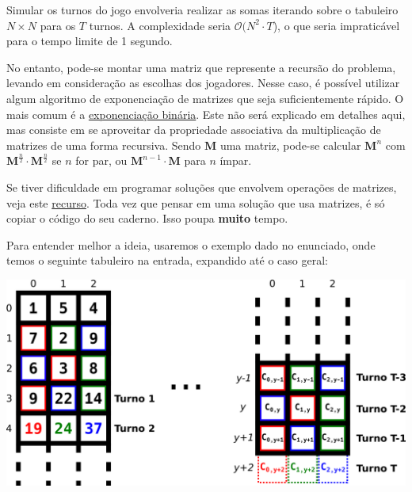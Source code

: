 \newcommand{\red}[1]{\textcolor{meuVermelho}{#1}}
\newcommand{\green}[1]{\textcolor{meuVerde}{#1}}
\newcommand{\blue}[1]{\textcolor{meuAzul}{#1}}

Simular os turnos do jogo envolveria realizar as somas iterando sobre o tabuleiro $N \times N$ para os $T$ turnos. A complexidade seria $\mathcal{O}(N^2\cdot T$), o que seria impraticável para o tempo limite de 1 segundo.

No entanto, pode-se montar uma matriz que represente a recursão do problema, levando em consideração as escolhas dos jogadores. Nesse caso, é possível utilizar algum algoritmo de exponenciação de matrizes que seja suficientemente rápido. O mais comum é a \href{https://cp-algorithms.com/algebra/binary-exp.html}{exponenciação binária}. Este não será explicado em detalhes aqui, mas consiste em se aproveitar da propriedade associativa da multiplicação de matrizes de uma forma recursiva. Sendo $\mathbf{M}$ uma matriz, pode-se calcular $\mathbf{M}^n$ com $\mathbf{M}^\frac{n}{2}\cdot\mathbf{M}^\frac{n}{2}$ se $n$ for par, ou $\mathbf{M}^{n-1}\cdot\mathbf{M}$ para $n$ ímpar.

Se tiver dificuldade em programar soluções que envolvem operações de matrizes, veja este \href{https://codeforces.com/blog/entry/21189}{recurso}. Toda vez que pensar em uma solução que usa matrizes, é só copiar o código do seu caderno. Isso poupa \textbf{muito} tempo.

Para entender melhor a ideia, usaremos o exemplo dado no enunciado, onde temos o seguinte tabuleiro na entrada, expandido até o caso geral:

\begin{center}
    \includegraphics[scale=0.6]{kummirub/exemplo-editorial.png}
\end{center}

